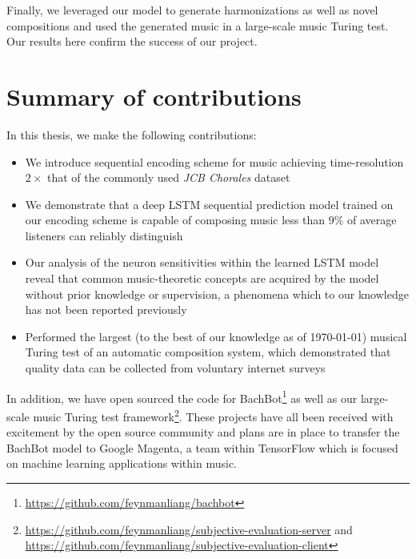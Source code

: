Finally, we leveraged our model to generate harmonizations as well as novel
compositions and used the generated music in a large-scale music Turing test.
Our results here confirm the success of our project.

\section{Summary of contributions}

In this thesis, we make the following contributions:
\begin{itemize}
    \item We introduce sequential encoding scheme for music achieving time-resolution $2\times$
        that of the commonly used \textit{JCB Chorales} \citep{Allan2005} dataset
    \item We demonstrate that a deep LSTM sequential prediction model trained
        on our encoding scheme is capable of composing music less than $9\%$ of
        average listeners can reliably distinguish
    \item Our analysis of the neuron sensitivities within the learned LSTM model
        reveal that common music-theoretic concepts are acquired by the model
        without prior knowledge or supervision, a phenomena which to our
        knowledge has not been reported previously
    \item Performed the largest (to the best of our knowledge as of \today)
        musical Turing test of an automatic composition system, which demonstrated
        that quality data can be collected from voluntary internet surveys
\end{itemize}

In addition, we have open sourced the code for
BachBot\footnote{\url{https://github.com/feynmanliang/bachbot}} as well as our
large-scale music Turing test
framework\footnote{\url{https://github.com/feynmanliang/subjective-evaluation-server}
and \url{https://github.com/feynmanliang/subjective-evaluation-client}}. These
projects have all been received with excitement by the open source community
and plans are in place to transfer the BachBot model to Google Magenta, a team
within TensorFlow \citep{abadi2016tensorflow} which is focused on machine
learning applications within music.


